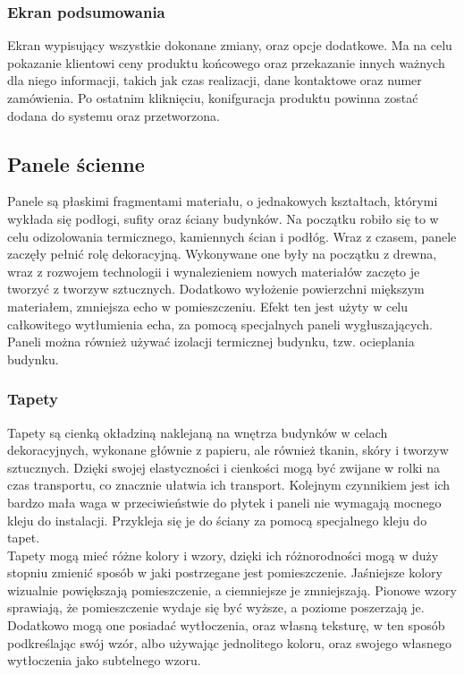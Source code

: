\documentclass{article} %
\begin{document}
        \subsubsection{Ekran podsumowania}
        Ekran wypisujący wszystkie dokonane zmiany, oraz opcje dodatkowe. Ma na celu pokazanie klientowi ceny produktu końcowego oraz przekazanie innych ważnych dla niego informacji, takich jak czas realizacji, dane kontaktowe oraz numer zamówienia. Po ostatnim kliknięciu, konifguracja produktu powinna zostać dodana do systemu oraz przetworzona.
        \\
        
        
    \subsection{Panele ścienne}
        Panele są płaskimi fragmentami materiału, o jednakowych kształtach, którymi wykłada się podłogi, sufity oraz ściany budynków. Na początku robiło się to w celu odizolowania termicznego, kamiennych ścian i podłóg. Wraz z czasem, panele zaczęły pełnić rolę dekoracyjną. Wykonywane one były na początku z drewna, wraz z rozwojem technologii i wynalezieniem nowych materiałów zaczęto je tworzyć z tworzyw sztucznych. Dodatkowo wyłożenie powierzchni miększym materiałem, zmniejsza echo w pomieszczeniu. Efekt ten jest użyty w celu całkowitego wytłumienia echa, za pomocą specjalnych paneli wygłuszających. Paneli można również używać izolacji termicznej budynku, tzw. ocieplania budynku. 
        \\
        
        \subsubsection{Tapety}
        Tapety są cienką okładziną naklejaną na wnętrza budynków w celach dekoracyjnych, wykonane głównie z papieru, ale również tkanin, skóry i tworzyw sztucznych. Dzięki swojej elastyczności i cienkości mogą być zwijane w rolki na czas transportu, co znacznie ułatwia ich transport. Kolejnym czynnikiem jest ich bardzo mała waga w przeciwieństwie do płytek i paneli nie wymagają mocnego kleju do instalacji. Przykleja się je do ściany za pomocą specjalnego kleju do tapet. 
        \\
        
        Tapety mogą mieć różne kolory i wzory, dzięki ich różnorodności mogą w duży stopniu zmienić sposób w jaki postrzegane jest pomieszczenie. Jaśniejsze kolory wizualnie powiększają pomieszczenie, a ciemniejsze je zmniejszają. Pionowe wzory sprawiają, że pomieszczenie wydaje się być wyższe, a poziome poszerzają je. Dodatkowo mogą one posiadać wytłoczenia, oraz własną teksturę, w ten sposób podkreślając swój wzór, albo używając jednolitego koloru, oraz swojego własnego wytłoczenia jako subtelnego wzoru. 
        \\
        
\end{document}
